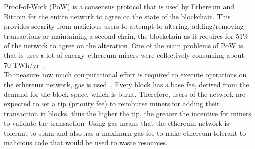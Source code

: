 Proof-of-Work (PoW) is a consensus protocol that is used by Ethereum and Bitcoin for the entire network to agree on the state of the blockchain. This provides security from malicious users to attempt to altering, adding/removing transactions or maintaining a second chain, the blockchain as it requires for 51\% of the network to agree on the alteration. One of the main problems of PoW is that is uses a lot of energy, ethereum miners were collectively consuming about 70 TWh/yr~\cite{noauthor_proof--work_nodate}.
\\[5mm]
To measure how much computational effort is required to execute operations on the ethereum network, gas is used~\cite{noauthor_proof--work_nodate}. Every block has a base fee, derived from the demand for the block space, which is burnt. Therefore, users of the network are expected to set a tip (priority fee) to reimburse miners for adding their transaction in blocks, thus the higher the tip, the greater the incentive for miners to validate the transaction. Using gas means that the ethereum network is tolerant to spam and also has a maximum gas fee to make ethereum tolerant to malicious code that would be used to waste resources.

